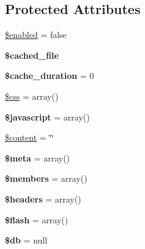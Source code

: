 \subsection*{Protected Attributes}
\begin{DoxyCompactItemize}
\item 
\hyperlink{class_output_a8d376199cc641e3e7af6e1a0d5c736d9}{\$enabled} = false
\item 
\hypertarget{class_output_a65e0bc16303487a8ed6dc4ddf2c910ba}{
{\bfseries \$cached\_\-file}}
\label{class_output_a65e0bc16303487a8ed6dc4ddf2c910ba}

\item 
\hypertarget{class_output_a2d404df21a2e6155219a43570e94800e}{
{\bfseries \$cache\_\-duration} = 0}
\label{class_output_a2d404df21a2e6155219a43570e94800e}

\item 
\hyperlink{class_output_a5619065f778cf71da2d43cbc4c47a1c4}{\$css} = array()
\item 
\hypertarget{class_output_a687855b3cefd1fc1232e0f457ff7e41b}{
{\bfseries \$javascript} = array()}
\label{class_output_a687855b3cefd1fc1232e0f457ff7e41b}

\item 
\hyperlink{class_output_a57b284fe00866494b33afa80ba729bed}{\$content} = \char`\"{}\char`\"{}
\item 
\hypertarget{class_output_a9e6fc1ae0498be7d1e682f8bcc9299df}{
{\bfseries \$meta} = array()}
\label{class_output_a9e6fc1ae0498be7d1e682f8bcc9299df}

\item 
\hypertarget{class_output_ae2118b67db555e724032d6b8c057e272}{
{\bfseries \$members} = array()}
\label{class_output_ae2118b67db555e724032d6b8c057e272}

\item 
\hypertarget{class_output_a52500036ee807241b8b4b7e2367c49ef}{
{\bfseries \$headers} = array()}
\label{class_output_a52500036ee807241b8b4b7e2367c49ef}

\item 
\hypertarget{class_output_a11e2a205d2151dc5076c63ef15911950}{
{\bfseries \$flash} = array()}
\label{class_output_a11e2a205d2151dc5076c63ef15911950}

\item 
\hypertarget{class_object_a1fa3127fc82f96b1436d871ef02be319}{
{\bfseries \$db} = null}
\label{class_object_a1fa3127fc82f96b1436d871ef02be319}

\end{DoxyCompactItemize}


